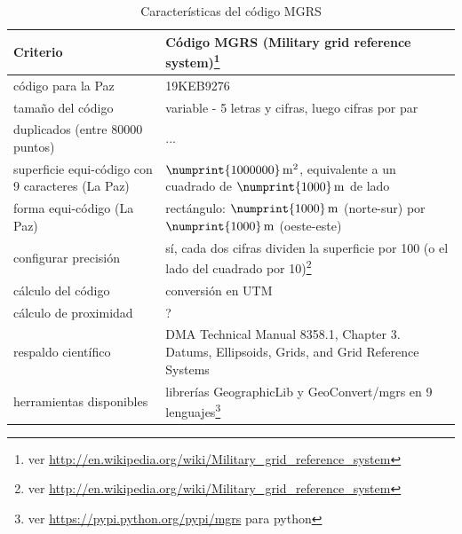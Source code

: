 \documentclass[letterpaper]{article}
\begin{document}
\begin{table}
	\centering
	\begin{tabu} to 
		\hline
		Criterio & Código MGRS (Military grid reference system)\footnote{ver 
		\url{http://en.wikipedia.org/wiki/Military_grid_reference_system}} \\
		\hline
		código para la Paz & 19KEB9276 \\
		\hline
		tamaño del código & variable - 5 letras y cifras, luego cifras 
		por par \\
		\hline
		duplicados (entre 80000 puntos) & ... \\
		\hline
		superficie equi-código con 9 caracteres (La Paz) & 
		\(\numprint{1000000}\,\mathrm{m^{2}}\), 
		equivalente a un cuadrado de \(\numprint{1000}\,\mathrm{m}\) de lado \\
		\hline
		forma equi-código (La Paz) & rectángulo: 
		\(\numprint{1000}\,\mathrm{m}\) (norte-sur) por 
		\(\numprint{1000}\,\mathrm{m}\) (oeste-este) \\
		\hline
		configurar precisión & sí, cada dos 
		cifras dividen la superficie por 100 (o el lado del cuadrado 
		por 10)\footnote{ver 
		\url{http://en.wikipedia.org/wiki/Military_grid_reference_system}} \\
		\hline
		cálculo del código & conversión en UTM \\
		\hline
		cálculo de proximidad & ? \\
		\hline
		respaldo científico & DMA Technical Manual 8358.1, Chapter 3. Datums, Ellipsoids, Grids, and Grid Reference Systems \\
		\hline
		herramientas disponibles & librerías GeographicLib y 
		GeoConvert/mgrs en 9 lenguajes\footnote{ver 
		\url{https://pypi.python.org/pypi/mgrs} para python} \\
		\hline
	\end{tabu}
	\caption{Características del código MGRS}
	\label{tab:carac_mgrs}
\end{table}
\end{document}
